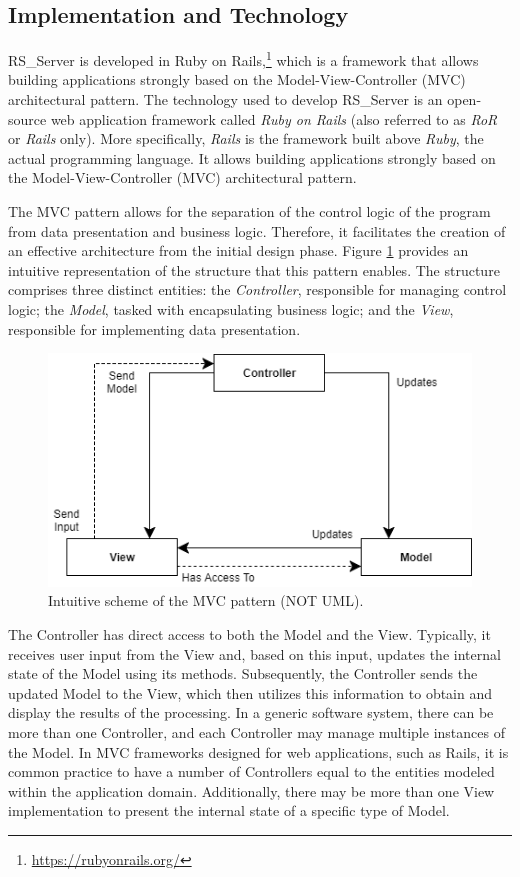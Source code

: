 \documentclass[a4paper, english]{article}
\newcommand{\rsserver}{RS\_Server\xspace}
\begin{document}
\subsection{Implementation and Technology}

\rsserver is developed in Ruby on Rails,\footnote{\url{https://rubyonrails.org/}} which is a framework that allows building applications strongly based on the Model-View-Controller (MVC) architectural pattern. The technology used to develop \rsserver is an open-source web application framework called \emph{Ruby on Rails} (also referred to as \emph{RoR} or \emph{Rails} only). More specifically, \emph{Rails} is the framework built above \emph{Ruby}, the actual programming language. It allows building applications strongly based on the Model-View-Controller (MVC) architectural pattern.

The MVC pattern allows for the separation of the control logic of the program from data presentation and business logic. Therefore, it facilitates the creation of an effective architecture from the initial design phase. Figure \ref{fig:mvc} provides an intuitive representation of the structure that this pattern enables. The structure comprises three distinct entities: the \emph{Controller}, responsible for managing control logic; the \emph{Model}, tasked with encapsulating business logic; and the \emph{View}, responsible for implementing data presentation.

\begin{figure}[!tbp]
\centering
\includegraphics[scale=0.7]{figures/mvc.png}
\caption{Intuitive scheme of the MVC pattern (NOT UML).}
\label{fig:mvc}
\end{figure}

The Controller has direct access to both the Model and the View. Typically, it receives user input from the View and, based on this input, updates the internal state of the Model using its methods. Subsequently, the Controller sends the updated Model to the View, which then utilizes this information to obtain and display the results of the processing. In a generic software system, there can be more than one Controller, and each Controller may manage multiple instances of the Model. In MVC frameworks designed for web applications, such as Rails, it is common practice to have a number of Controllers equal to the entities modeled within the application domain. Additionally, there may be more than one View implementation to present the internal state of a specific type of Model.
\end{document}
